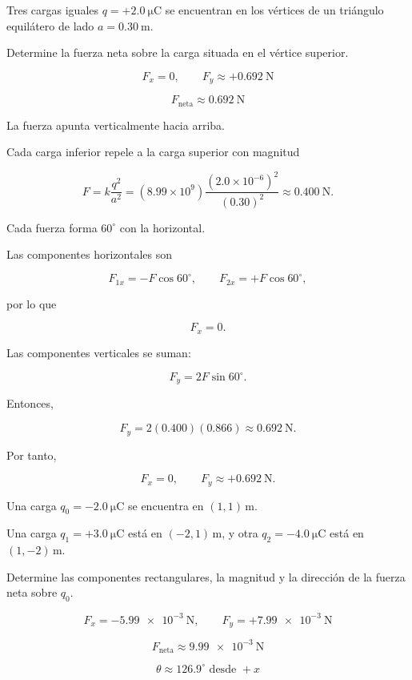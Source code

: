 \begin{ejercicio}
Tres cargas iguales \(q=+\SI{2.0}{\micro\coulomb}\) se encuentran en los
vértices de un triángulo equilátero de lado \(a=\SI{0.30}{\metre}\).

Determine la fuerza neta sobre la carga situada en el vértice superior.
\end{ejercicio}

\begin{respuesta}
\[
\boxed{F_x=0}, \qquad
\boxed{F_y\approx+\SI{0.692}{\newton}}
\]

\[
\boxed{F_{\text{neta}}\approx\SI{0.692}{\newton}}
\]

La fuerza apunta verticalmente hacia arriba.
\end{respuesta}

\begin{explicacion}
Cada carga inferior repele a la carga superior con magnitud

\[
F=k\frac{q^2}{a^2}
=(8.99\times10^9)
\frac{(2.0\times10^{-6})^2}{(0.30)^2}
\approx\SI{0.400}{\newton}.
\]

Cada fuerza forma \(60^\circ\) con la horizontal.

Las componentes horizontales son

\[
F_{1x}=-F\cos60^\circ, \qquad
F_{2x}=+F\cos60^\circ,
\]

por lo que

\[
F_x=0.
\]

Las componentes verticales se suman:

\[
F_y=2F\sin60^\circ.
\]

Entonces,

\[
F_y=2(0.400)(0.866)\approx\SI{0.692}{\newton}.
\]

Por tanto,

\[
\boxed{F_x=0}, \qquad
\boxed{F_y\approx+\SI{0.692}{\newton}}.
\]
\end{explicacion}


\begin{ejercicio}
Una carga \(q_0=-\SI{2.0}{\micro\coulomb}\) se encuentra en
\((1,1)\,\si{\metre}\).

Una carga \(q_1=+\SI{3.0}{\micro\coulomb}\) está en
\((-2,1)\,\si{\metre}\), y otra \(q_2=-\SI{4.0}{\micro\coulomb}\) está en
\((1,-2)\,\si{\metre}\).

Determine las componentes rectangulares, la magnitud y la dirección de la
fuerza neta sobre \(q_0\).
\end{ejercicio}

\begin{respuesta}
\[
\boxed{F_x=-\SI{5.99e-3}{\newton}}, \qquad
\boxed{F_y=+\SI{7.99e-3}{\newton}}
\]

\[
\boxed{F_{\text{neta}}\approx\SI{9.99e-3}{\newton}}
\]

\[
\boxed{\theta\approx126.9^\circ\text{ desde }+x}
\]
\end{respuesta}


